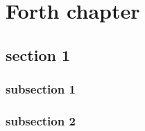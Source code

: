 \chapter{Forth chapter}
\label{ch:ch4}

\section{section 1}\label{sec:ch4/sec1}
	\subsection{subsection 1}\label{subsec:ch4/sec1/sub1}
	\subsection{subsection 2}\label{subsec:ch4/sec1/sub2}
\section{}\label{sec:ch4/sect2}

\section{}\label{sec:ch4/sect3}